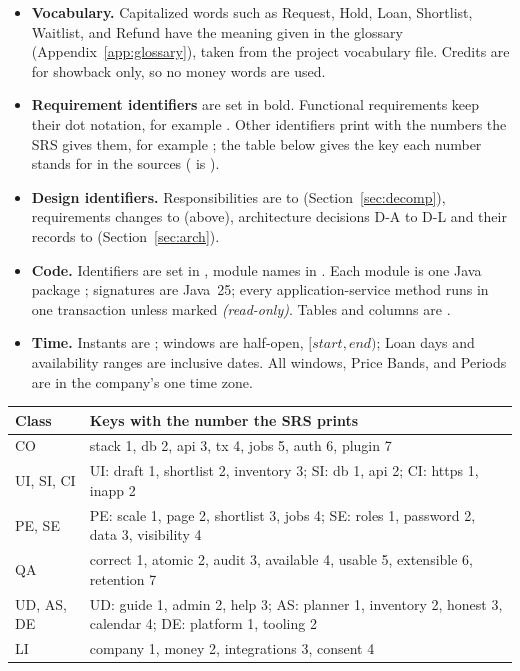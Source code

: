 \begin{itemize}
  \item \textbf{Vocabulary.} Capitalized words such as Request, Hold, Loan, Shortlist, Waitlist, and Refund have the meaning given in the glossary (Appendix~\ref{app:glossary}), taken from the project vocabulary file. Credits are for showback only, so no money words are used.
  \item \textbf{Requirement identifiers} are set in bold. Functional requirements keep their dot notation, for example . Other identifiers print with the numbers the SRS gives them, for example ; the table below gives the key each number stands for in the sources ( is ).
  \item \textbf{Design identifiers.} Responsibilities are  to  (Section~\ref{sec:decomp}), requirements changes  to  (above), architecture decisions D-A to D-L and their records  to  (Section~\ref{sec:arch}).
  \item \textbf{Code.} Identifiers are set in , module names in . Each module is one Java package ; signatures are Java~25; every application-service method runs in one transaction unless marked \emph{(read-only)}. Tables and columns are .
  \item \textbf{Time.} Instants are ; windows are half-open, $[\mathit{start}, \mathit{end})$; Loan days and availability ranges are inclusive dates. All windows, Price Bands, and Periods are in the company's one time zone.
\end{itemize}

{\small\renewcommand{\arraystretch}{1.05}
\begin{tabularx}{\textwidth}{@{}L{1cm}Y@{}}
\toprule
\textbf{Class} & \textbf{Keys with the number the SRS prints} \\
\midrule
CO & stack 1, db 2, api 3, tx 4, jobs 5, auth 6, plugin 7 \\
UI, SI, CI & UI: draft 1, shortlist 2, inventory 3; SI: db 1, api 2; CI: https 1, inapp 2 \\
PE, SE & PE: scale 1, page 2, shortlist 3, jobs 4; SE: roles 1, password 2, data 3, visibility 4 \\
QA & correct 1, atomic 2, audit 3, available 4, usable 5, extensible 6, retention 7 \\
UD, AS, DE & UD: guide 1, admin 2, help 3; AS: planner 1, inventory 2, honest 3, calendar 4; DE: platform 1, tooling 2 \\
LI & company 1, money 2, integrations 3, consent 4 \\
\bottomrule
\end{tabularx}
}
